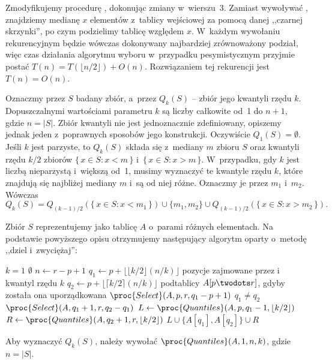 \exercise %
Zmodyfikujemy procedurę , dokonując zmiany w~wierszu~3. Zamiast wywoływać , znajdziemy medianę $x$ elementów z~tablicy wejściowej za pomocą danej ,,czarnej skrzynki'', po czym podzielimy tablicę względem $x$. W~każdym wywołaniu rekurencyjnym będzie wówczas dokonywany najbardziej zrównoważony podział, więc czas działania algorytmu wyboru w~przypadku pesymistycznym przyjmie postać $T(n)=T(\lfloor n/2\rfloor)+O(n)$. Rozwiązaniem tej rekurencji jest $T(n)=O(n)$.

\exercise %
Oznaczmy przez $S$ badany zbiór, a~przez $Q_k(S)$ -- zbiór jego kwantyli rzędu $k$. Dopuszczalnymi wartościami parametru $k$ są liczby całkowite od~1 do $n+1$, gdzie $n=|S|$. Zbiór kwantyli nie jest jednoznacznie zdefiniowany, opiszemy jednak jeden z~poprawnych sposobów jego konstrukcji. Oczywiście $Q_1(S)=\emptyset$. Jeśli $k$ jest parzyste, to $Q_k(S)$ składa się z~mediany $m$ zbioru $S$ oraz kwantyli rzędu $k/2$ zbiorów $\{\,x\in S:x<m\,\}$ i~$\{\,x\in S:x>m\,\}$. W~przypadku, gdy $k$ jest liczbą nieparzystą i~większą od~1, musimy wyznaczyć te kwantyle rzędu $k$, które znajdują się najbliżej mediany $m$ i~są od niej różne. Oznaczmy je przez $m_1$ i~$m_2$. Wówczas
\[
	Q_k(S) = Q_{(k-1)/2}(\{\,x\in S:x<m_1\,\})\cup\{m_1,m_2\}\cup Q_{(k-1)/2}(\{\,x\in S:x>m_2\,\}).
\]

Zbiór $S$ reprezentujemy jako tablicę $A$ o~parami różnych elementach. Na podstawie powyższego opisu otrzymujemy następujący algorytm oparty o~metodę ,,dziel i~zwyciężaj'':
\begin{codebox}
\li	\If $k=1$
\li		\Then \Return $\emptyset$
		\End
\li	$n\gets r-p+1$
\li	$q_1\gets p+\lfloor\lfloor k/2\rfloor(n/k)\rfloor$ \>\>\>\>\>\>\Comment pozycje zajmowane przez  i~ kwantyl rzędu $k$
\li	$q_2\gets p+\lfloor\lceil k/2\rceil(n/k)\rfloor$ \>\>\>\>\>\>\>podtablicy $A[p\twodots r]$, gdyby została ona uporządkowana
\li	$\proc{Select}(A,p,r,q_1-p+1)$
\li	\If $q_1\ne q_2$
\li		\Then $\proc{Select}(A,q_1+1,r,q_2-q_1)$ \label{li:quantiles-second-select}
		\End
\li	$L\gets\proc{Quantiles}(A,p,q_1-1,\lfloor k/2\rfloor)$
\li	$R\gets\proc{Quantiles}(A,q_2+1,r,\lfloor k/2\rfloor)$
\li	\Return $L\cup\{A[q_1],A[q_2]\}\cup R$
\end{codebox}
Aby wyznaczyć $Q_k(S)$, należy wywołać $\proc{Quantiles}(A,1,n,k)$, gdzie $n=|S|$.

